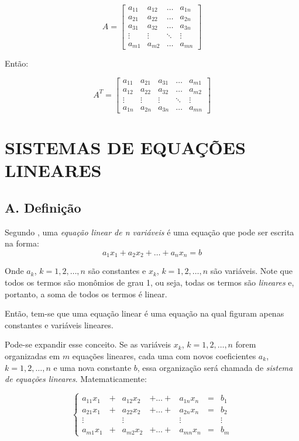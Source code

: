 \documentclass[twocolumn, 10pt]{extarticle}
\begin{document}
\[ 
A = 
\begin{bmatrix}
a_{11} & a_{12} & \dots & a_{1n} \\
a_{21} & a_{22} & \dots & a_{2n} \\
a_{31} & a_{32} & \dots & a_{3n} \\
\vdots & \vdots & \ddots & \vdots \\
a_{m1} & a_{m2} & \dots & a_{mn}  


\end{bmatrix}
\]

Então:

\[ 
A^T = 
\begin{bmatrix}
a_{11} & a_{21} & a_{31} & \dots & a_{m1} \\
a_{12} & a_{22} & a_{32} & \dots & a_{m2} \\
\vdots & \vdots & \vdots & \ddots & \vdots \\
a_{1n} & a_{2n} & a_{3n} & \dots & a_{mn} 

\end{bmatrix}
\]

\section{SISTEMAS DE EQUAÇÕES LINEARES}

\subsection*{A. \quad Definição}
Segundo \cite[p. 2]{antonAlgebra}, uma \textit{equação linear de n variáveis} é uma equação que pode ser escrita na forma:
\[
	a_1x_1 + a_2x_2 + \dots + a_nx_n = b
\]

Onde $a_k$, $k = 1, 2, \dots, n$ são constantes e $x_k$, $k = 1, 2, \dots, n$ são variáveis. Note que todos os termos são monômios de grau 1, ou seja, todas os termos são \textit{lineares} e, portanto, a soma de todos os termos é linear. 

Então, tem-se que uma equação linear é uma equação na qual figuram apenas constantes e variáveis lineares.

Pode-se expandir esse conceito. Se as variáveis $x_k$, $k = 1, 2, \dots, n$ forem organizadas em $m$ equações lineares, cada uma com novos coeficientes $a_k$, $k = 1, 2, \dots, n$ e uma nova constante $b$, essa organização será chamada de \textit{sistema de equações lineares}. Matematicamente:

\[
\left\{
\begin{aligned}
   a_{11}x_1 & + &  a_{12}x_2 & + \dots + & a_{1n}x_n &= & b_1 \\
   a_{21}x_1 & + &  a_{22}x_2 & + \dots + & a_{2n}x_n &= & b_2 \\
   \vdots &   & \vdots &  &  \vdots  & & \vdots \\
   a_{m1}x_1 & + &  a_{m2}x_2 & + \dots + & a_{mn}x_n &= & b_m 
\end{aligned}
\right.
\]
\end{document}
